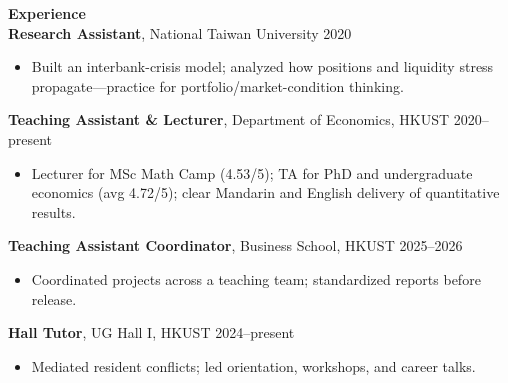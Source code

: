 \documentclass[11pt,letterpaper]{article}
\begin{document}
{\large \textbf{Experience}}\\[-0.5pt]
\textbf{Research Assistant}, National Taiwan University \hfill 2020\\
\vspace{-6pt}
\begin{itemize}
  \item Built an interbank-crisis model; analyzed how positions and liquidity stress propagate---practice for portfolio/market-condition thinking.
\end{itemize}
\textbf{Teaching Assistant \& Lecturer}, Department of Economics, HKUST \hfill 2020--present\\
\vspace{-6pt}
\begin{itemize}
  \item Lecturer for MSc Math Camp (4.53/5); TA for PhD and undergraduate economics (avg 4.72/5); clear Mandarin and English delivery of quantitative results.
\end{itemize}
\textbf{Teaching Assistant Coordinator}, Business School, HKUST \hfill 2025--2026\\
\vspace{-6pt}
\begin{itemize}
  \item Coordinated projects across a teaching team; standardized reports before release.
\end{itemize}
\textbf{Hall Tutor}, UG Hall I, HKUST \hfill 2024--present\\
\vspace{-6pt}
\begin{itemize}
  \item Mediated resident conflicts; led orientation, workshops, and career talks.
\end{itemize}

\vspace{0.15pt}
\end{document}
